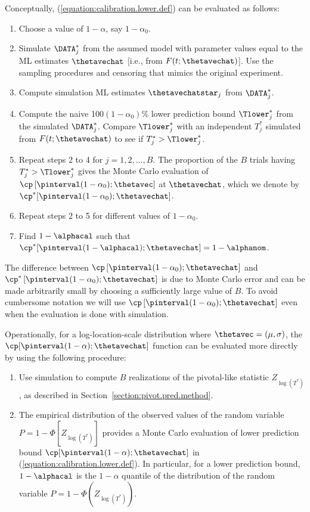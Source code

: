 Conceptually, (\ref{equation:calibration.lower.def}) can be evaluated as
follows:
\begin{enumerate}
\item
Choose a value of $1-\alpha$, say $1-\alpha_{0}$.
\item
Simulate $\DATA^{*}_{j}$ from the assumed model with
parameter values equal to the ML estimates $\thetavechat$ [i.e., from
$F(t;\thetavechat )$]. Use the 
sampling procedures and censoring that mimics the original experiment.
\item
Compute simulation ML estimates $\thetavechatstar_{j}$ from $\DATA^{*}_{j}$.
\item
Compute the naive 100$(1-\alpha_{0})\%$ lower prediction bound
$\Tlower_{j}^{*}$ from the simulated $\DATA^{*}_{j}$. Compare
$\Tlower_{j}^{*}$ with
an independent $T_{j}^{*}$ simulated from
$F(t;\thetavechat )$ to see if $T_{j}^{*}>\Tlower_{j}^{*}$.
\item 
Repeat steps 2 to 4 for $j=1,2,\ldots,B$.  The proportion of the
$B$ trials having $T_{j}^{*} > \Tlower_{j}^{*}$ gives the Monte
Carlo evaluation of $\cp\left [ \pinterval(1-\alpha_{0}); \thetavec
\right ]$ at $\thetavechat$, which we denote by
$\cp^{*}[\pinterval(1-\alpha_{0});\thetavechat]$.
\item
Repeat steps 2 to 5 for different values of $1-\alpha_{0}$.
\item
Find $1-\alphacal$ such that $\cp^{*}[ \pinterval(1-\alphacal)
;\thetavechat]= 1-\alphanom$.
\end{enumerate}
The difference between $\cp
\left [ \pinterval(1-\alpha_{0}); \thetavechat \right ]$
and $\cp^{*}\left [\pinterval(1-\alpha_{0}) ;\thetavechat\right ]$
is due to Monte Carlo error and can be made arbitrarily small by
choosing a sufficiently large value of $B$. To avoid
cumbersome notation we will use $\cp
\left [ \pinterval(1-\alpha_{0}); \thetavechat \right ]$ even when the
evaluation is done with simulation.

Operationally, for a log-location-scale distribution where $\thetavec=
(\mu,\sigma)$, the $\cp[\pinterval(1-\alpha) ;\thetavechat]$ function
can be evaluated more directly by using the following procedure:
\begin{enumerate}
\item
Use simulation to compute $B$ realizations of the pivotal-like statistic
$Z_{\log(T^{*})}$, as described in
Section~\ref{section:pivot.pred.method}.
\item
The empirical distribution of the observed values of the random
variable $P=1-\Phi[Z_{\log(T^{*})}]$ provides a Monte Carlo
evaluation of lower prediction bound $\cp[\pinterval(1-\alpha)
;\thetavechat]$ in (\ref{equation:calibration.lower.def}). In particular,
for a lower prediction bound, $1-\alphacal$ is the $1-\alpha$
quantile of the distribution of the random variable $P= 1 -
\Phi(Z_{\log(T^{*})})$.
\end{enumerate}  

